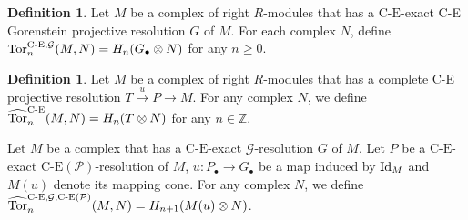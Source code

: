 \documentclass[reqno,12pt]{amsart}
\numberwithin{equation}{section}
\theoremstyle{plain}
\theoremstyle{definition}
\newtheorem{definition}[theorem]{\bf Definition}
\newcommand{\CE}{\mathrm{C}\text{-}\mathrm{E}}
\begin{document}
\begin{definition}\label{def-2}
    Let $M$ be a complex of right $R$-modules that has a $\CE$-exact C-E Gorenstein projective resolution $G$ of $M$. For each complex $N$, define $\Tor^{\CE,\mathcal{G}}_n(M,N)=H_n(G_{\bullet}\otimes N)$ for any $n\geq 0$.
\end{definition}

\begin{definition}
    Let $M$ be a complex of right $R$-modules that has a complete C-E projective resolution $T\stackrel{u}\to P\to M$. For any complex $N$, we define $\widehat{\mbox{\rm Tor}}_n^{\text{C-E}}(M,N)=H_n(T\otimes N)$ for any $n\in\mathbb{Z}$.
\end{definition}

Let $M$ be a complex that has a $\CE$-exact $\mathcal{G}$-resolution $G$ of $M$. Let $P$ be a $\CE$-exact $\text{C-E}(\mathcal{P})$-resolution of $M$, $u:P_{\bullet}\to G_{\bullet}$ be a map induced by $\mbox{\rm Id}_M$ and $M(u)$ denote its mapping cone. For any complex $N$, we define $\widehat{\mbox{\rm Tor}}_n^{\text{C-E},\mathcal{G},\text{C-E}(\mathcal{P})}(M,N)=H_{n+1}(M(u)\otimes N)$.
\end{document}
